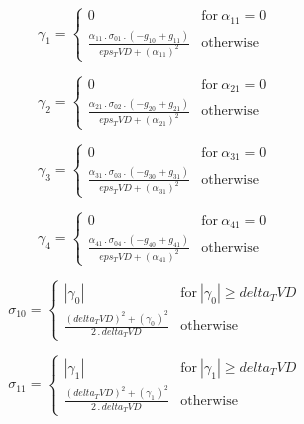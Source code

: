 \documentclass{article}
\begin{document}
\begin{dmath}\gamma_{1} = \begin{cases} 0 & \text{for}\: \alpha_{11} = 0 \\\frac{\alpha_{11} \,.\, \sigma_{0 1} \,.\, \left(- g_{10} + g_{11}\right)}{eps_TVD + \left(\alpha_{11} \right)^{2}} & \text{otherwise} \end{cases}\end{dmath}

\begin{dmath}\gamma_{2} = \begin{cases} 0 & \text{for}\: \alpha_{21} = 0 \\\frac{\alpha_{21} \,.\, \sigma_{0 2} \,.\, \left(- g_{20} + g_{21}\right)}{eps_TVD + \left(\alpha_{21} \right)^{2}} & \text{otherwise} \end{cases}\end{dmath}

\begin{dmath}\gamma_{3} = \begin{cases} 0 & \text{for}\: \alpha_{31} = 0 \\\frac{\alpha_{31} \,.\, \sigma_{0 3} \,.\, \left(- g_{30} + g_{31}\right)}{eps_TVD + \left(\alpha_{31} \right)^{2}} & \text{otherwise} \end{cases}\end{dmath}

\begin{dmath}\gamma_{4} = \begin{cases} 0 & \text{for}\: \alpha_{41} = 0 \\\frac{\alpha_{41} \,.\, \sigma_{0 4} \,.\, \left(- g_{40} + g_{41}\right)}{eps_TVD + \left(\alpha_{41} \right)^{2}} & \text{otherwise} \end{cases}\end{dmath}

\begin{dmath}\sigma_{1 0} = \begin{cases} \left|{\gamma_{0}}\right| & \text{for}\: \left|{\gamma_{0}}\right| \geq delta_TVD \\\frac{\left(delta_TVD \right)^{2} + \left(\gamma_{0} \right)^{2}}{2 \,.\, delta_TVD} & \text{otherwise} 
\end{cases}\end{dmath}

\begin{dmath}\sigma_{1 1} = \begin{cases} \left|{\gamma_{1}}\right| & \text{for}\: \left|{\gamma_{1}}\right| \geq delta_TVD \\\frac{\left(delta_TVD \right)^{2} + \left(\gamma_{1} \right)^{2}}{2 \,.\, delta_TVD} & \text{otherwise} 
\end{cases}\end{dmath}
\end{document}
